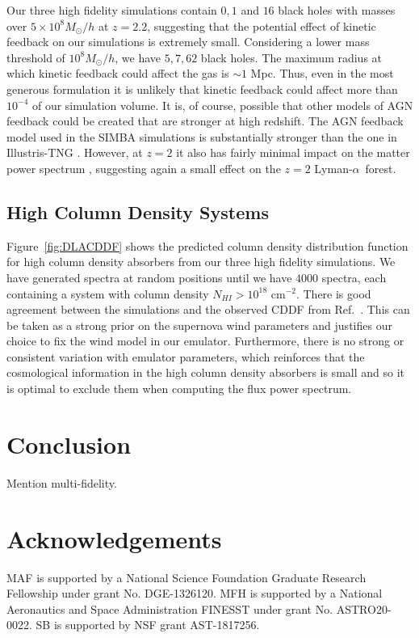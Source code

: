 \documentclass[a4paper,11pt]{article}
\newcommand{\Lya}{Lyman-$\alpha$}
\begin{document}
Our three high fidelity simulations contain $0, 1$ and $16$ black holes with masses over $5\times 10^8 M_\odot/h$ at $z=2.2$, suggesting that the potential effect of kinetic feedback on our simulations is extremely small. Considering a lower mass threshold of $10^8 M_\odot/h$, we have $5, 7, 62$ black holes. The maximum radius at which kinetic feedback could affect the gas is $\sim 1$ Mpc. Thus, even in the most generous formulation it is unlikely that kinetic feedback could affect more than $10^{-4}$ of our simulation volume. It is, of course, possible that other models of AGN feedback could be created that are stronger at high redshift. The AGN feedback model used in the SIMBA simulations \cite{SIMBA} is substantially stronger than the one in Illustris-TNG \cite{Tillman:2022}. However, at $z=2$ it also has fairly minimal impact on the matter power spectrum \cite{CAMELS}, suggesting again a small effect on the $z=2$ \Lya~forest.

\subsection{High Column Density Systems}

Figure~\ref{fig:DLACDDF} shows the predicted column density distribution function for high column density absorbers from our three high fidelity simulations. We have generated spectra at random positions until we have $4000$ spectra, each containing a system with column density $N_{HI} > 10^{18}$ cm$^{-2}$. There is good agreement between the simulations and the observed CDDF from Ref.~\cite{2021MNRAS.507..704H}. This can be taken as a strong prior on the supernova wind parameters and justifies our choice to fix the wind model in our emulator. Furthermore, there is no strong or consistent variation with emulator parameters, which reinforces that the cosmological information in the high column density absorbers is small and so it is optimal to exclude them when computing the flux power spectrum.


\section{Conclusion}

Mention multi-fidelity.

\section*{Acknowledgements}
MAF is supported by a National Science Foundation Graduate Research Fellowship under grant No. DGE-1326120.
MFH is supported by a National Aeronautics and Space Administration FINESST under grant No. ASTRO20-0022.
SB is supported by NSF grant AST-1817256.
\end{document}
